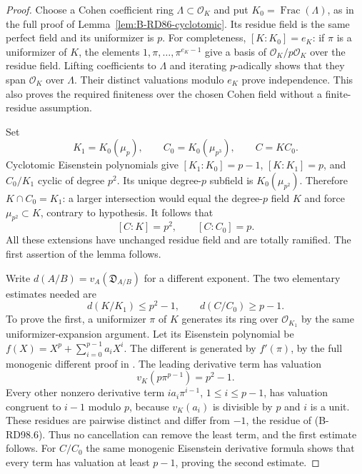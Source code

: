\begin{proof}
Choose a Cohen coefficient ring $\Lambda\subset\mathcal O_K$
and put $K_0=\operatorname{Frac}(\Lambda)$, as in the full
proof of Lemma~\ref{lem:B-RD86-cyclotomic}. Its residue field
is the same perfect field and its uniformizer is $p$.
For completeness, $[K:K_0]=e_K$: if $\pi$ is a uniformizer
of $K$, the elements $1,\pi,\ldots,\pi^{e_K-1}$ give a basis
of $\mathcal O_K/p\mathcal O_K$ over the residue field.
Lifting coefficients to $\Lambda$ and iterating $p$-adically
shows that they span $\mathcal O_K$ over $\Lambda$.
Their distinct valuations modulo $e_K$ prove independence.
This also proves the required finiteness over the chosen Cohen
field without a finite-residue assumption.

Set
\[
 K_1=K_0(\mu_p),\qquad C_0=K_0(\mu_{p^3}),\qquad C=KC_0.
                                                        \tag{B-RD98.3}
\]
Cyclotomic Eisenstein polynomials give
$[K_1:K_0]=p-1$, $[K:K_1]=p$, and $C_0/K_1$ cyclic of
degree $p^2$. Its unique degree-$p$ subfield is
$K_0(\mu_{p^2})$. Therefore $K\cap C_0=K_1$: a larger
intersection would equal the degree-$p$ field $K$ and force
$\mu_{p^2}\subset K$, contrary to hypothesis. It follows that
\[
                       [C:K]=p^2,\qquad[C:C_0]=p.
                                                        \tag{B-RD98.4}
\]
All these extensions have unchanged residue field and are
totally ramified. The first assertion of the lemma follows.

Write $d(A/B)=v_A(\mathfrak D_{A/B})$ for a different exponent.
The two elementary estimates needed are
\[
                      d(K/K_1)\le p^2-1,
                      \qquad d(C/C_0)\ge p-1.
                                                        \tag{B-RD98.5}
\]
To prove the first, a uniformizer $\pi$ of $K$ generates its
ring over $\mathcal O_{K_1}$ by the same uniformizer-expansion
argument. Let its Eisenstein polynomial be
$f(X)=X^p+\sum_{i=0}^{p-1}a_iX^i$.
The different is generated by $f'(\pi)$, by the full
monogenic different proof in \cite[Proposition3.18 and proof,
pp.~17--18]{ColmezCorpsLocaux}. The leading derivative term
has valuation
\[
                    v_K(p\pi^{p-1})=p^2-1.
                                                        \tag{B-RD98.6}
\]
Every other nonzero derivative term $i a_i\pi^{i-1}$,
$1\le i\le p-1$, has valuation congruent to $i-1$ modulo $p$,
because $v_K(a_i)$ is divisible by $p$ and $i$ is a unit.
These residues are pairwise distinct and differ from $-1$,
the residue of (B-RD98.6). Thus no cancellation can remove the
least term, and the first estimate follows. For $C/C_0$ the
same monogenic Eisenstein derivative formula shows that every
term has valuation at least $p-1$, proving the second estimate.


\end{proof}

